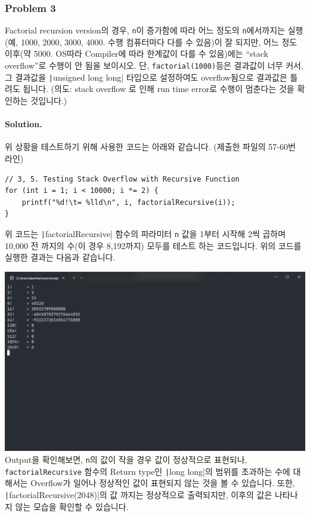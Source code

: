 \subsubsection{Problem 3}
Factorial recursion version의 경우,
\texttt{n}이 증가함에 따라
어느 정도의 \texttt{n}에서까지는 실행(예, 1000, 2000, 3000, 4000. 수행 컴퓨터마다 다를 수 있음)이 잘 되지만,
어느 정도 이후(약 5000. OS따라 Compiler에 따라 한계값이 다를 수 있음)에는
``stack overflow''로 수행이 안 됨을 보이시오.
단, \texttt{factorial(1000)}등은 결과값이 너무 커서,
그 결과값을 \texttt|unsigned long long| 타입으로 설정하여도 overflow됨으로 결과값은 틀려도 됩니다.
(의도: stack overflow 로 인해 run time error로 수행이 멈춘다는 것을 확인하는 것입니다.)

\paragraph{Solution.}
위 상황을 테스트하기 위해 사용한 코드는 아래와 같습니다. (제출한 파일의 57-60번 라인)
\begin{verbatim}
// 3, 5. Testing Stack Overflow with Recursive Function
for (int i = 1; i < 10000; i *= 2) {
    printf("%d!\t= %lld\n", i, factorialRecursive(i));
}
\end{verbatim}
위 코드는 \texttt|factorialRecursive| 함수의 파라미터 \texttt{n} 값을 1부터 시작해 2씩 곱하며 10,000 전 까지의 수(이 경우 8,192까지) 모두를 테스트 하는 코드입니다.
위의 코드를 실행한 결과는 다음과 같습니다.

\includegraphics[width=\textwidth]{./img/3-1.png}
Output을 확인해보면, \texttt{n}의 값이 작을 경우 값이 정상적으로 표현되나,
\texttt{factorialRecursive} 함수의 Return type인 \texttt|long long|의 범위를 초과하는 수에 대해서는 Overflow가 일어나 정상적인 값이 표현되지 않는 것을 볼 수 있습니다.
또한, \texttt|factorialRecursive(2048)|의 값 까지는 정상적으로 출력되지만, 이후의 값은 나타나지 않는 모습을 확인할 수 있습니다.

